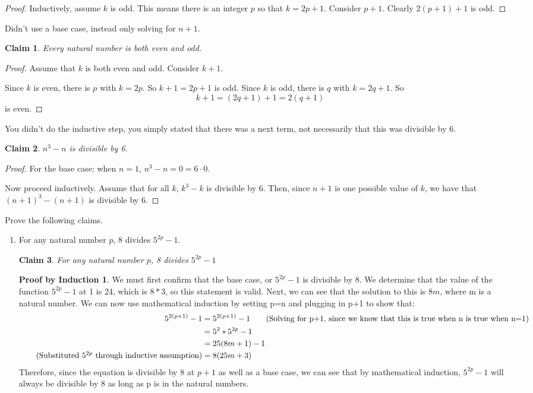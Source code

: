 \documentclass[11pt]{letter}
\newtheorem{claim}{Claim}
\theoremstyle{definition}
\newtheorem{PBI}{Proof by Induction}
\begin{document}
\begin{description}
\begin{enumerate}
\begin{proof}
					Inductively, assume $k$ is odd. This means there is an integer $p$ so that $k=2p+1$. Consider $p+1$. Clearly $2(p+1)+1$ is odd.
				\end{proof}
				Didn't use a base case, instead only solving for $n+1$. 
				\begin{claim}
					Every natural number is both even and odd.
				\end{claim}
				\begin{proof}
					Assume that $k$ is both even and odd. Consider $k+1$.
					
					Since $k$ is even, there is $p$ with $k=2p$. So $k+1=2p+1$ is odd. Since $k$ is odd, there is $q$ with $k=2q+1$. So $$k+1=(2q+1)+1=2(q+1)$$is even.
				\end{proof}
                                You didn't do the inductive step, you simply stated that there was a next term, not necessarily that this was divisible by 6.
				\begin{claim}
					$n^3-n$ is divisible by 6.
				\end{claim}
				\begin{proof}
					For the base case: when $n=1$, $n^3-n=0=6\cdot 0$.
					
					Now proceed inductively. Assume that for all $k$, $k^3-k$ is divisible by 6. Then, since $n+1$ is one possible value of $k$, we have that $(n+1)^3-(n+1)$ is divisible by 6. 
				\end{proof}

		\end{enumerate}
	\item[proofs] Prove the following claims. 
          \setcounter{claim}{0}
		\begin{enumerate}
			\item For any natural number $p$, 8 divides $5^{2p}-1$.
\begin{claim}
For any natural number $p$, 8 divides $5^{2p}-1$
\end{claim}
\begin{PBI}
We must first confirm that the base case, or $5^{2p}-1$ is divisible by 8. We determine that the value of the function $5^{2p}-1$ at 1 is 24, which is $8*3$, so this statement is valid. Next, we can see that the solution to this is $8m$, where m is a natural number. We can now use mathematical induction by setting p=n and plugging in p+1 to show that: \\
\begin{align*}  
5^{2(p+1)}-1 &= 5^{2(p+1)}-1 \tag{Solving for p+1, since we know that this is true when n is true when n=1} \\
&= 5^2*5^{2p}-1 \\
&=25(8m+1)-1 \\ \tag{Substituted $5^{2p}$ through inductive assumption}
&=8(25m+3) \\
\end{align*}
Therefore, since the equation is divisible by 8 at $p+1$ as well as a base case, we can see that by mathematical induction, $5^{2p}-1$ will always be divisible by 8 as long as p is in the natural numbers. \\
\end{PBI}


\end{enumerate}
\end{description}
\end{document}
